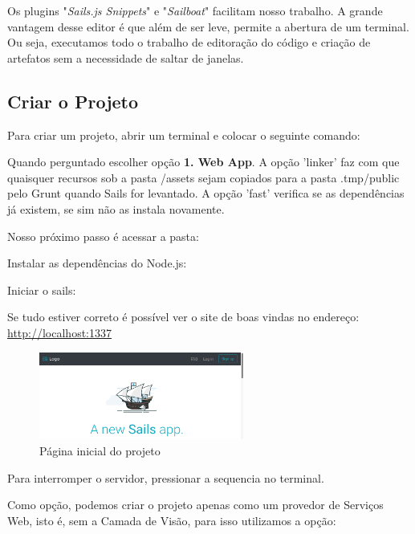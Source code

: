 \documentclass[a4paper,11pt]{article}
\begin{document}
Os plugins "\textit{Sails.js Snippets}" e "\textit{Sailboat}" facilitam nosso trabalho. A grande vantagem desse editor é que além de ser leve, permite a abertura de um terminal. Ou seja, executamos todo o trabalho de editoração do código e criação de artefatos sem a necessidade de saltar de janelas.

\subsection{Criar o Projeto}
Para criar um projeto, abrir um terminal e colocar o seguinte comando: \\

Quando perguntado escolher opção \textbf{1. Web App}. A opção 'linker' faz com que quaisquer recursos sob a pasta /assets sejam copiados para a pasta .tmp/public pelo Grunt quando Sails for levantado. A opção 'fast' verifica se as dependências já existem, se sim não as instala novamente. 

Nosso próximo passo é acessar a pasta: \\

Instalar as dependências do Node.js: \\

Iniciar o sails: \\

Se tudo estiver correto é possível ver o site de boas vindas no endereço:
\url{http://localhost:1337}
\begin{figure}[H]
	\centering
	\includegraphics[width=0.6\textwidth]{imagens/paginaInicial.png}
	\caption{Página inicial do projeto}
\end{figure}

Para interromper o servidor, pressionar a sequencia  no terminal.

Como opção, podemos criar o projeto apenas como um provedor de Serviços Web, isto é, sem a Camada de Visão, para isso utilizamos a opção: \\
\end{document}
